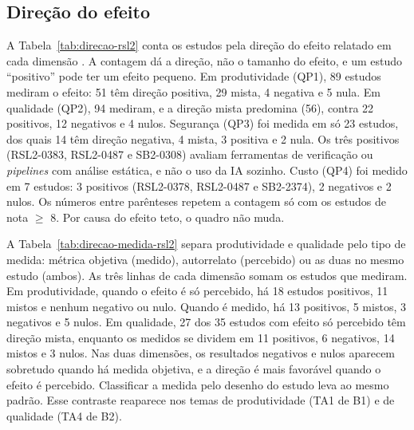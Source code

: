 \subsection{Direção do efeito}
\label{sec:resultados-rsl2-direcao}



A Tabela~\ref{tab:direcao-rsl2} conta os estudos pela direção do efeito
relatado em cada dimensão \cite[quadro 1]{page2021ee}. A contagem dá a
direção, não o tamanho do efeito, e um estudo ``positivo'' pode ter um efeito
pequeno. Em produtividade (QP1), 89 estudos mediram o efeito: 51 têm direção
positiva, 29 mista, 4 negativa e 5 nula. Em qualidade (QP2), 94 mediram, e a
direção mista predomina (56), contra 22 positivos, 12 negativos e 4 nulos.
Segurança (QP3) foi medida em só 23 estudos, dos quais 14 têm direção
negativa, 4 mista, 3 positiva e 2 nula. Os três positivos (RSL2-0383,
RSL2-0487 e SB2-0308) avaliam ferramentas de verificação ou
\textit{pipelines} com análise estática, e não o uso da IA sozinho. Custo
(QP4) foi medido em 7 estudos: 3 positivos (RSL2-0378, RSL2-0487 e
SB2-2374), 2 negativos e 2 nulos. Os números entre parênteses repetem a
contagem só com os estudos de nota $\geq$ 8. Por causa do efeito teto, o
quadro não muda.

A Tabela~\ref{tab:direcao-medida-rsl2} separa produtividade e qualidade pelo
tipo de medida: métrica objetiva (medido), autorrelato (percebido) ou as duas
no mesmo estudo (ambos). As três linhas de cada dimensão somam os estudos que
mediram. Em produtividade, quando o efeito é só percebido, há 18 estudos
positivos, 11 mistos e nenhum negativo ou nulo. Quando é medido, há 13
positivos, 5 mistos, 3 negativos e 5 nulos. Em qualidade, 27 dos 35 estudos
com efeito só percebido têm direção mista, enquanto os medidos se dividem em
11 positivos, 6 negativos, 14 mistos e 3 nulos. Nas duas dimensões, os
resultados negativos e nulos aparecem sobretudo quando há medida objetiva, e
a direção é mais favorável quando o efeito é percebido. Classificar a medida
pelo desenho do estudo leva ao mesmo padrão. Esse contraste reaparece nos temas de produtividade (TA1 de B1) e
de qualidade (TA4 de B2).

